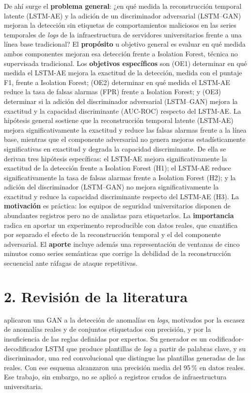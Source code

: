 \documentclass[jou,a4paper,floatsintext,donotrepeattitle]{apa7}
\begin{document}
De ahí surge el \textbf{problema general}: ¿en qué medida la reconstrucción temporal latente (LSTM-AE) y la adición de un discriminador adversarial (LSTM--GAN) mejoran la detección sin etiquetas de comportamientos maliciosos en las series temporales de \textit{logs} de la infraestructura de servidores universitarios frente a una línea base tradicional? El \textbf{propósito} u objetivo general es evaluar en qué medida ambos componentes mejoran esa detección frente a Isolation Forest, técnica no supervisada tradicional. Los \textbf{objetivos específicos} son (OE1) determinar en qué medida el LSTM-AE mejora la exactitud de la detección, medida con el puntaje F1, frente a Isolation Forest; (OE2) determinar en qué medida el LSTM-AE reduce la tasa de falsas alarmas (FPR) frente a Isolation Forest; y (OE3) determinar si la adición del discriminador adversarial (LSTM--GAN) mejora la exactitud y la capacidad discriminante (AUC-ROC) respecto del LSTM-AE. La hipótesis general sostiene que la reconstrucción temporal latente (LSTM-AE) mejora significativamente la exactitud y reduce las falsas alarmas frente a la línea base, mientras que el componente adversarial no genera mejoras estadísticamente significativas en exactitud y degrada la capacidad discriminante. De ella se derivan tres hipótesis específicas: el LSTM-AE mejora significativamente la exactitud de la detección frente a Isolation Forest (H1); el LSTM-AE reduce significativamente la tasa de falsas alarmas frente a Isolation Forest (H2); y la adición del discriminador (LSTM--GAN) no mejora significativamente la exactitud y reduce la capacidad discriminante respecto del LSTM-AE (H3). La \textbf{motivación} es práctica: los equipos de seguridad universitarios disponen de abundantes registros pero no de analistas para etiquetarlos. La \textbf{importancia} radica en aportar un experimento reproducible con datos reales, que cuantifica por separado el efecto de la reconstrucción temporal y el del componente adversarial. El \textbf{aporte} incluye además una representación de ventanas de cinco minutos como series semánticas que corrige la debilidad de la reconstrucción secuencial ante ráfagas de ataque repetitivas.

\section{2. Revisión de la literatura}
\textcite{duan2021} aplicaron una GAN a la detección de anomalías en \textit{logs}, motivados por la escasez de anomalías reales y de conjuntos etiquetados con precisión, y por la insuficiencia de las reglas definidas por expertos. Su generador es un codificador-decodificador LSTM que produce plantillas de \textit{log} a partir de palabras clave, y su discriminador, una red convolucional que distingue las plantillas generadas de las reales. Con ese esquema alcanzaron una precisión media del 95\,\% en datos reales. Ese trabajo, sin embargo, no se aplicó a registros crudos de infraestructura universitaria.
\end{document}
